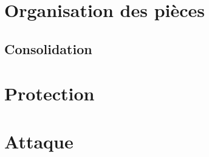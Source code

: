 
\section{Organisation des pièces}

\subsection{Consolidation}

\section{Protection}

\section{Attaque}

